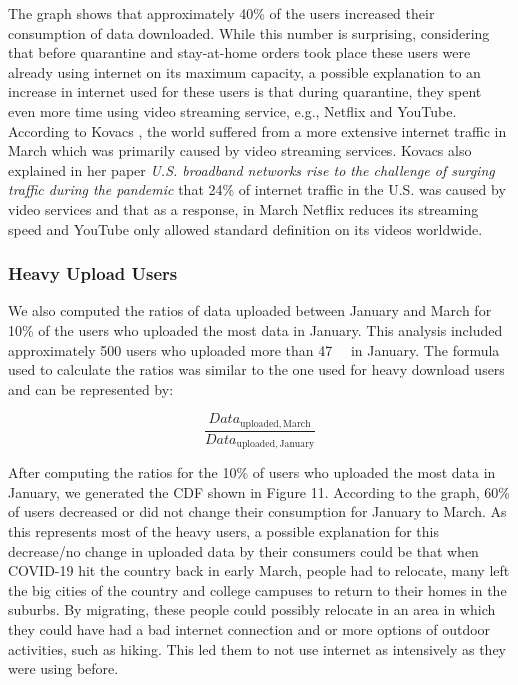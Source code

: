 \documentclass[conference,10pt]{IEEEtran}
\begin{document}
The graph shows that approximately 40\% of the users increased their consumption of data downloaded. While this number is surprising, considering that before quarantine and stay-at-home orders took place these users were already using internet on its maximum capacity, a possible explanation to an increase in internet used for these users is that during quarantine, they spent even more time using video streaming service, e.g., Netflix and YouTube. According to Kovacs \cite{kovacs}, the world suffered from a more extensive internet traffic in March which was primarily caused by video streaming services. Kovacs also explained in her paper \textit{U.S. broadband networks rise to the challenge of surging traffic during the pandemic} that 24\% of internet traffic in the U.S. was caused by video services and that as a response, in March Netflix reduces its streaming speed and YouTube only allowed standard definition on its videos worldwide.

\subsubsection{Heavy Upload Users}
\label{sec:heavy-upload-users}

We also computed the ratios of data uploaded between January and March for 10\% of the users who uploaded the most data in January. This analysis included approximately 500 users who uploaded more than \SI{47}{\giga\byte} in January. The formula used to calculate the ratios was similar to the one used for heavy download users and can be represented by:

\begin{equation}
\frac{Data_{\text{uploaded},\, \text{March}}}{Data_{\text{uploaded},\, \text{January}}}
\end{equation}


After computing the ratios for the 10\% of users who uploaded the most data in January, we generated the CDF shown in Figure 11. According to the graph, 60\% of users decreased or did not change their consumption for January to March. As this represents most of the heavy users, a possible explanation for this decrease/no change in uploaded data by their consumers could be that when COVID-19 hit the country back in early March, people had to relocate, many left the big cities of the country and college campuses to return to their homes in the suburbs. By migrating, these people could possibly relocate in an area in which they could have had a bad internet connection and or more options of outdoor activities, such as hiking. This led them to not use internet as intensively as they were using before.
\end{document}
